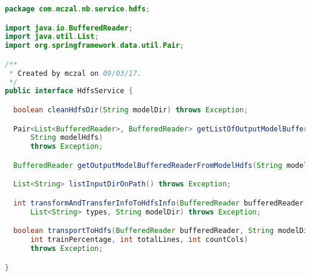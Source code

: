 \begin{lstlisting}[language=Java,basicstyle=\tiny,caption=HdfsService.java]
package com.mczal.nb.service.hdfs;

import java.io.BufferedReader;
import java.util.List;
import org.springframework.data.util.Pair;

/**
 * Created by mczal on 09/03/17.
 */
public interface HdfsService {

  boolean cleanHdfsDir(String modelDir) throws Exception;

  Pair<List<BufferedReader>, BufferedReader> getListOfOutputModelBufferedReaderFromModelHdfs(
      String modelHdfs)
      throws Exception;

  BufferedReader getOutputModelBufferedReaderFromModelHdfs(String modelHdfs) throws Exception;

  List<String> listInputDirOnPath() throws Exception;

  int transformAndTransferInfoToHdfsInfo(BufferedReader bufferedReader, List<String> clazz,
      List<String> types, String modelDir) throws Exception;

  boolean transportToHdfs(BufferedReader bufferedReader, String modelDir, int atomic,
      int trainPercentage, int totalLines, int countCols)
      throws Exception;

}

\end{lstlisting}

